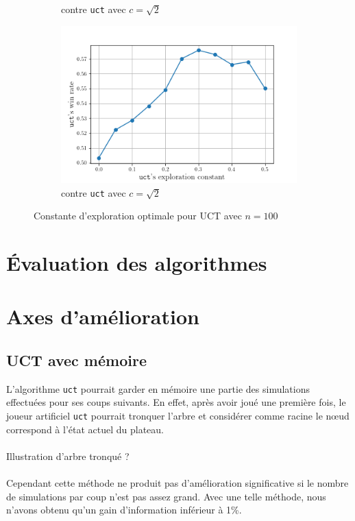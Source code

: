 \documentclass[a4paper]{article}
\theoremstyle{definition}
\begin{document}
\begin{figure}[!h]
\begin{subfigure}{0.49\textwidth}
		\caption{contre \texttt{uct} avec $c = \sqrt{2}$}
		\label{fig:2_}
	\end{subfigure}
	\hfill
	\begin{subfigure}{0.5\textwidth}
		\centering
		\includegraphics[width=\textwidth]{test3.png}
		\caption{contre \texttt{uct} avec $c = \sqrt{2}$}
		\label{fig:3_}
	\end{subfigure}
	\caption{Constante d'exploration optimale pour UCT avec $n=100$}
	\label{fig:best-cst}
\end{figure}

\newpage

\section{Évaluation des algorithmes}


\newpage

\section{Axes d'amélioration}

\subsection{UCT avec mémoire}

L'algorithme \texttt{uct} pourrait garder en mémoire une partie des simulations effectuées pour ses coups suivants. En effet, après avoir joué une première fois, le joueur artificiel \texttt{uct} pourrait tronquer l'arbre et considérer comme racine le nœud correspond à l'état actuel du plateau.\\
\\
Illustration d'arbre tronqué ?\\
\\
Cependant cette méthode ne produit pas d'amélioration significative si le nombre de simulations par coup n'est pas assez grand. Avec une telle méthode, nous n'avons obtenu qu'un gain d'information inférieur à 1\%.
\end{document}
